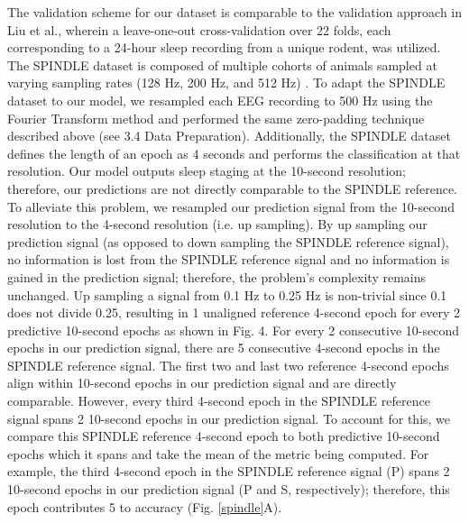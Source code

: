 \documentclass[pdflatex,sn-mathphys-num]{sn-jnl}%
\theoremstyle{thmstyleone}%
\theoremstyle{thmstyletwo}%
\theoremstyle{thmstylethree}%
\begin{document}
The validation scheme for our dataset is comparable to the validation approach in Liu et al.\cite{liu_attention-based_2022}, wherein a leave-one-out cross-validation over 22 folds, each corresponding to a 24-hour sleep recording from a unique rodent, was utilized. The SPINDLE dataset is composed of multiple cohorts of animals sampled at varying sampling rates (128 Hz, 200 Hz, and 512 Hz) \cite{miladinovic_spindle_2019}. To adapt the SPINDLE dataset to our model, we resampled each EEG recording to 500 Hz using the Fourier Transform method and performed the same zero-padding technique described above (see 3.4 Data Preparation). Additionally, the SPINDLE dataset defines the length of an epoch as 4 seconds and performs the classification at that resolution. Our model outputs sleep staging at the 10-second resolution; therefore, our predictions are not directly comparable to the SPINDLE reference. To alleviate this problem, we resampled our prediction signal from the 10-second resolution to the 4-second resolution (i.e. up sampling). By up sampling our prediction signal (as opposed to down sampling the SPINDLE reference signal), no information is lost from the SPINDLE reference signal and no information is gained in the prediction signal; therefore, the problem's complexity remains unchanged. Up sampling a signal from 0.1 Hz to 0.25 Hz is non-trivial since 0.1 does not divide 0.25, resulting in 1 unaligned reference 4-second epoch for every 2 predictive 10-second epochs as shown in Fig. 4. For every 2 consecutive 10-second epochs in our prediction signal, there are 5 consecutive 4-second epochs in the SPINDLE reference signal. The first two and last two reference 4-second epochs align within 10-second epochs in our prediction signal and are directly comparable. However, every third 4-second epoch in the SPINDLE reference signal spans 2 10-second epochs in our prediction signal. To account for this, we compare this SPINDLE reference 4-second epoch to both predictive 10-second epochs which it spans and take the mean of the metric being computed. For example, the third 4-second epoch in the SPINDLE reference signal (P) spans 2 10-second epochs in our prediction signal (P and S, respectively); therefore, this epoch contributes  5 to accuracy (Fig. \ref{spindle}A).
\end{document}
